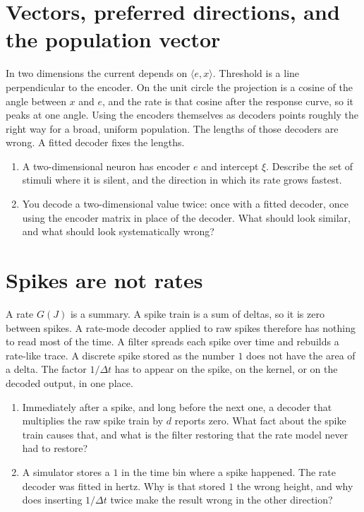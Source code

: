 \documentclass[11pt,letterpaper]{article}
\begin{document}
\section{Vectors, preferred directions, and the population vector}

\begin{idea}
In two dimensions the current depends on \(\langle e, x\rangle\). Threshold is a line perpendicular to the encoder. On the unit circle the projection is a cosine of the angle between \(x\) and \(e\), and the rate is that cosine after the response curve, so it peaks at one angle. Using the encoders themselves as decoders points roughly the right way for a broad, uniform population. The lengths of those decoders are wrong. A fitted decoder fixes the lengths.
\end{idea}

\begin{enumerate}
\item A two-dimensional neuron has encoder \(e\) and intercept \(\xi\). Describe the set of stimuli where it is silent, and the direction in which its rate grows fastest.
\item You decode a two-dimensional value twice: once with a fitted decoder, once using the encoder matrix in place of the decoder. What should look similar, and what should look systematically wrong?
\end{enumerate}

\section{Spikes are not rates}

\begin{idea}
A rate \(G(J)\) is a summary. A spike train is a sum of deltas, so it is zero between spikes. A rate-mode decoder applied to raw spikes therefore has nothing to read most of the time. A filter spreads each spike over time and rebuilds a rate-like trace. A discrete spike stored as the number \(1\) does not have the area of a delta. The factor \(1/\Delta t\) has to appear on the spike, on the kernel, or on the decoded output, in one place.
\end{idea}

\begin{enumerate}
\item Immediately after a spike, and long before the next one, a decoder that multiplies the raw spike train by \(d\) reports zero. What fact about the spike train causes that, and what is the filter restoring that the rate model never had to restore?
\item A simulator stores a \(1\) in the time bin where a spike happened. The rate decoder was fitted in hertz. Why is that stored \(1\) the wrong height, and why does inserting \(1/\Delta t\) twice make the result wrong in the other direction?
\end{enumerate}
\end{document}
